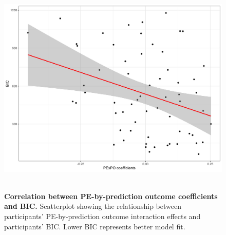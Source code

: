 \documentclass[a4paper,12pt]{article}
\begin{document}
 \begin{figure}
{\includegraphics[width=1\textwidth]{figures/PExPO_BIC.jpg}}\
\caption{\textbf{Correlation between PE-by-prediction outcome coefficients and BIC.} Scatterplot showing the relationship between participants' PE-by-prediction outcome interaction effects and participants' BIC. Lower BIC represents better model fit.  }
\label{fig:PE_PE_BIC}

\end{figure}
 
\end{document}
